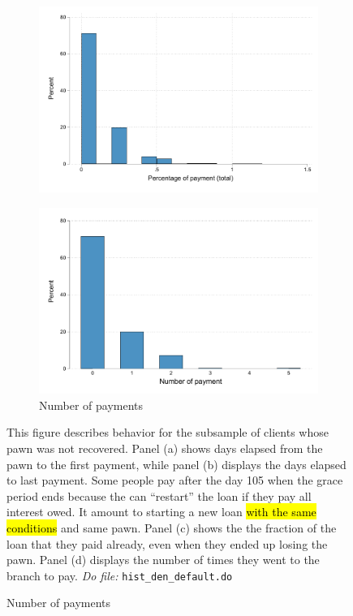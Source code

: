 \documentclass[11pt]{article}
\begin{document}
\begin{figure}[H]
\begin{center}
\begin{subfigure}{0.40\textwidth}
        \includegraphics[width=\textwidth]{Figuras/hist_percpay_default.pdf}
    \end{subfigure}
    \begin{subfigure}{0.40\textwidth}
        \caption{Number of payments}
        \centering
        \includegraphics[width=\textwidth]{Figuras/hist_numpay_default.pdf}
    \end{subfigure}
    \end{center}
        \scriptsize 
        This figure describes behavior for the subsample of clients whose pawn was not recovered.  Panel (a) shows days elapsed from the pawn to the first payment, while panel (b) displays the days elapsed to last payment. Some people pay after the day 105 when the grace period ends because the can ``restart'' the loan if they pay all interest owed. It amount to starting a new loan \hl{with the same conditions} and same pawn. Panel (c) shows the the fraction of the loan that they paid already, even when they ended up losing the pawn. Panel (d) displays the number of times they went to the branch to pay.      
      \textit{Do file: }  \texttt{hist\_den\_default.do}
\end{figure}
\end{document}
